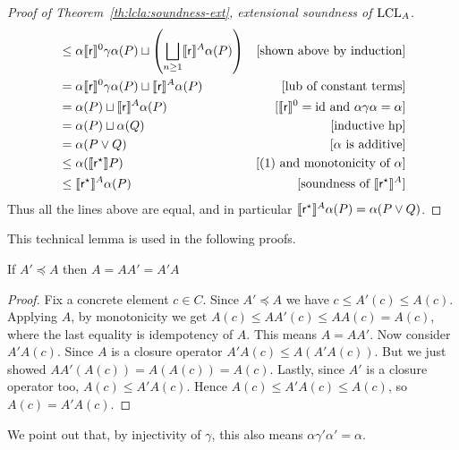 \begin{proof}[Proof of Theorem~\ref{th:lcla:soundness-ext}, extensional soundness of $\text{LCL}_A$]
\begin{align*}
		                                     & \le \alpha \llbracket\mathsf{r}\rrbracket^0 \gamma \alpha(P) \sqcup \left( \bigsqcup_{n \ge 1} \llbracket\mathsf{r}\rrbracket^{A} \alpha(P) \right)           & [\text{shown above by induction}]                                 \\
		                                     & = \alpha \llbracket\mathsf{r}\rrbracket^0 \gamma \alpha(P) \sqcup \llbracket\mathsf{r}\rrbracket^{A} \alpha(P)                                                & [\text{lub of constant terms}]                                    \\
		                                     & = \alpha(P) \sqcup \llbracket\mathsf{r}\rrbracket^{A} \alpha(P)                                                                              & [\llbracket\mathsf{r}\rrbracket^0 = \text{id} \text{ and }\alpha \gamma \alpha = \alpha] \\
		                                     & = \alpha(P) \sqcup \alpha(Q)                                                                                                & [\text{inductive hp}]                                             \\
		                                     & = \alpha(P \lor Q)                                                                                                          & [\alpha \text{ is additive}]                                      \\
		                                     & \le \alpha (\llbracket\mathsf{r}^{\star}\rrbracket P)                                                                                       & [\text{(1) and monotonicity of }\alpha]                           \\
		                                     & \le \llbracket\mathsf{r}^{\star}\rrbracket^{A} \alpha(P)                                                                                    & [\text{soundness of }\llbracket\mathsf{r}^{\star}\rrbracket^{A}]
	\end{align*}
	Thus all the lines above are equal, and in particular $\llbracket\mathsf{r}^{\star}\rrbracket^{A} \alpha(P) = \alpha(P \lor Q)$.
\end{proof}

This technical lemma is used in the following proofs.
\begin{lemma}\label{lmm:app:lemma-AA'}
	If $A' \preceq A$ then $A = A A' = A' A$
\end{lemma}
\begin{proof}
	Fix a concrete element $c \in C$. Since $A' \preceq A$ we have $c \le A'(c) \le A(c)$. Applying $A$, by monotonicity we get $A(c) \le AA'(c) \le AA(c) = A(c)$, where the last equality is idempotency of $A$. This means $A = AA'$.
	Now consider $A' A(c)$. Since $A$ is a closure operator $A' A(c) \le A (A' A(c))$. But we just showed $A A' (A(c)) = A (A(c)) = A(c)$. Lastly, since $A'$ is a closure operator too, $A(c) \le A' A(c)$. Hence $A(c) \le A' A(c) \le A(c)$, so $A(c) = A' A(c)$.
\end{proof}
We point out that, by injectivity of $\gamma$, this also means $\alpha \gamma' \alpha' = \alpha$.

